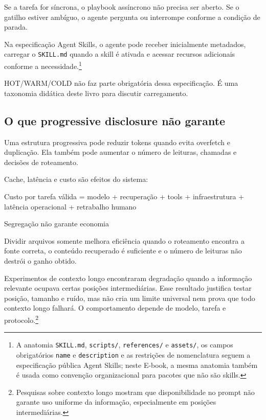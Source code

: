 \documentclass[
  10pt,
  a4paper,
  oneside]{book}
\newenvironment{Shaded}{}{}
\newcommand{\NormalTok}[1]{#1}
\begin{document}
Se a tarefa for síncrona, o playbook assíncrono não precisa ser aberto.
Se o gatilho estiver ambíguo, o agente pergunta ou interrompe conforme a
condição de parada.

Na especificação Agent Skills, o agente pode receber inicialmente
metadados, carregar o \texttt{SKILL.md} quando a skill é ativada e
acessar recursos adicionais conforme a necessidade.\footnote{A anatomia
  \texttt{SKILL.md}, \texttt{scripts/}, \texttt{references/} e
  \texttt{assets/}, os campos obrigatórios \texttt{name} e
  \texttt{description} e as restrições de nomenclatura seguem a
  especificação pública Agent Skills; neste E-book, a mesma anatomia
  também é usada como convenção organizacional para pacotes que não são
  skills.}

HOT/WARM/COLD não faz parte obrigatória dessa especificação. É uma
taxonomia didática deste livro para discutir carregamento.

\hypertarget{o-que-progressive-disclosure-nuxe3o-garante}{%
\subsection{O que progressive disclosure não
garante}\label{o-que-progressive-disclosure-nuxe3o-garante}}

Uma estrutura progressiva pode reduzir tokens quando evita overfetch e
duplicação. Ela também pode aumentar o número de leituras, chamadas e
decisões de roteamento.

Cache, latência e custo são efeitos do sistema:

\begin{Shaded}
\begin{Highlighting}[]
\NormalTok{Custo por tarefa válida}
\NormalTok{    = modelo}
\NormalTok{    + recuperação}
\NormalTok{    + tools}
\NormalTok{    + infraestrutura}
\NormalTok{    + latência operacional}
\NormalTok{    + retrabalho humano}
\end{Highlighting}
\end{Shaded}

\begin{warningbox}{Segregação não garante economia}

Dividir arquivos somente melhora eficiência quando o roteamento encontra
a fonte correta, o conteúdo recuperado é suficiente e o número de
leituras não destrói o ganho obtido.

\end{warningbox}

Experimentos de contexto longo encontraram degradação quando a
informação relevante ocupava certas posições intermediárias. Esse
resultado justifica testar posição, tamanho e ruído, mas não cria um
limite universal nem prova que todo contexto longo falhará. O
comportamento depende de modelo, tarefa e protocolo.\footnote{Pesquisas
  sobre contexto longo mostram que disponibilidade no prompt não garante
  uso uniforme da informação, especialmente em posições intermediárias.}
\end{document}
